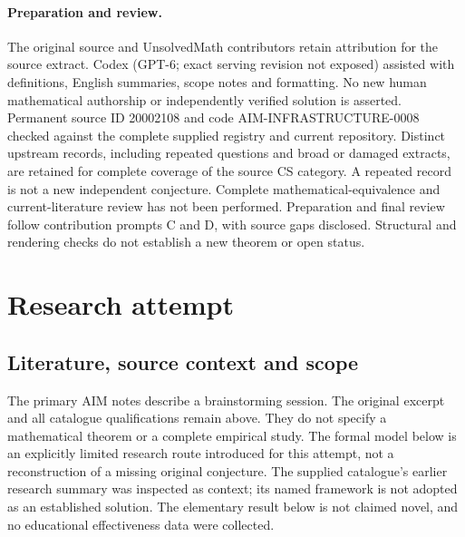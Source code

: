 \documentclass[11pt]{article}
\begin{document}
\paragraph{Preparation and review.}
The original source and UnsolvedMath contributors retain attribution for the source extract. Codex (GPT-6; exact serving revision not exposed) assisted with definitions, English summaries, scope notes and formatting. No new human mathematical authorship or independently verified solution is asserted. Permanent source ID 20002108 and code AIM-INFRASTRUCTURE-0008 checked against the complete supplied registry and current repository. Distinct upstream records, including repeated questions and broad or damaged extracts, are retained for complete coverage of the source CS category. A repeated record is not a new independent conjecture. Complete mathematical-equivalence and current-literature review has not been performed. Preparation and final review follow contribution prompts C and D, with source gaps disclosed. Structural and rendering checks do not establish a new theorem or open status.
\label{end:20002108}

\section{Research attempt}
\subsection{Literature, source context and scope}
The primary AIM notes describe a brainstorming session. The original excerpt and all catalogue qualifications remain above. They do not specify a mathematical theorem or a complete empirical study. The formal model below is an explicitly limited research route introduced for this attempt, not a reconstruction of a missing original conjecture. The supplied catalogue's earlier research summary was inspected as context; its named framework is not adopted as an established solution. The elementary result below is not claimed novel, and no educational effectiveness data were collected.
\end{document}
